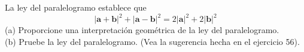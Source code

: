 \item La ley del paralelogramo establece que
    \[
    |\mathbf{a} + \mathbf{b}|^2 + |\mathbf{a} - \mathbf{b}|^2 = 2|\mathbf{a}|^2 + 2|\mathbf{b}|^2
    \]
    (a) Proporcione una interpretación geométrica de la ley del paralelogramo. \\
    (b) Pruebe la ley del paralelogramo. (Vea la sugerencia hecha en el ejercicio 56).
